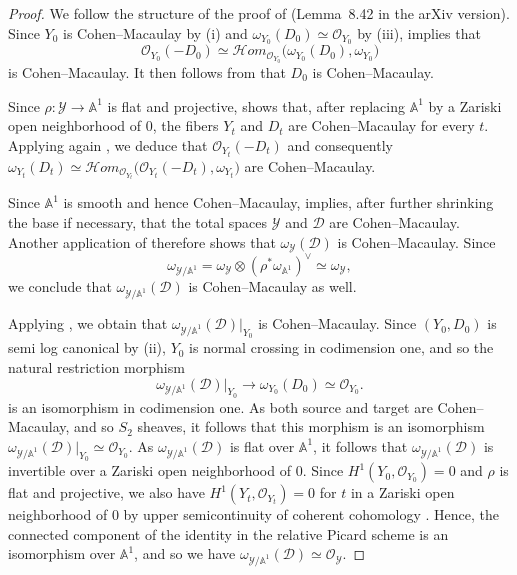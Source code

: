\documentclass[12pt,letterpaper, reqno]{amsart}
\theoremstyle{defstyle} \newtheorem{definition}[theorem]{Definition}
\theoremstyle{remark}
\numberwithin{equation}{section}
\numberwithin{figure}{section}
\newcommand{\A} {\mathbb{A}}
\newcommand{\cO} {\mathcal{O}}
\begin{document}
\begin{proof}
We follow the structure of the proof of \cite[Lemma~8.33]{GHKK} (Lemma~8.42 in the arXiv version).
Since $Y_0$ is Cohen--Macaulay by (i) and $\omega_{Y_0}(D_0)\simeq\mathcal O_{Y_0}$ by (iii), \cite[Corollary~2.71]{kollar2013singularities} implies that
\[
\mathcal O_{Y_0}(-D_0)
\simeq
\mathcal Hom_{\mathcal O_{Y_0}}\!\bigl(\omega_{Y_0}(D_0),\omega_{Y_0}\bigr)
\]
is Cohen--Macaulay. It then follows from \cite[Corollary~2.63]{kollar2013singularities} that $D_0$ is Cohen--Macaulay.

Since $\rho:\mathcal Y\to\A^1$ is flat and projective, \cite[Theorem~12.2.4]{grothendieck1966EGAIV} shows that, after replacing $\A^1$ by a Zariski open neighborhood of $0$, the fibers $Y_t$ and $D_t$ are Cohen--Macaulay for every $t$. Applying again \cite[Corollaries~2.63 and~2.71]{kollar2013singularities}, we deduce that
$\mathcal O_{Y_t}(-D_t)$
and consequently $
\omega_{Y_t}(D_t)
\simeq
\mathcal Hom_{\mathcal O_{Y_t}}
\bigl(\mathcal O_{Y_t}(-D_t),\omega_{Y_t}\bigr)$
are Cohen--Macaulay.

Since $\A^1$ is smooth and hence Cohen--Macaulay, \cite[\href{https://stacks.math.columbia.edu/tag/045J}{Tag~045J}]{stacks-project} implies, after further shrinking the base if necessary, that the total spaces $\mathcal Y$ and $\mathcal D$ are Cohen--Macaulay. Another application of \cite[Corollaries~2.63 and~2.71]{kollar2013singularities} therefore shows that $\omega_{\mathcal Y}(\mathcal D)$ is Cohen--Macaulay. Since
\[
\omega_{\mathcal Y/\A^1}
=
\omega_{\mathcal Y}\otimes(\rho^*\omega_{\A^1})^\vee
\simeq
\omega_{\mathcal Y},
\]
we conclude that $\omega_{\mathcal Y/\A^1}(\mathcal D)$ is Cohen--Macaulay as well.

Applying \cite[\href{https://stacks.math.columbia.edu/tag/045J}{Tag~045J}]{stacks-project}, we obtain that
$\omega_{\mathcal Y/\A^1}(\mathcal D)\big|_{Y_0}$ is Cohen--Macaulay.
Since $(Y_0,D_0)$ is semi log canonical by (ii), $Y_0$ is normal crossing in codimension one, and so the natural restriction morphism
\[
\omega_{\mathcal Y/\A^1}(\mathcal D)\big|_{Y_0}
\longrightarrow
\omega_{Y_0}(D_0)
\simeq
\mathcal O_{Y_0}.
\]
is an isomorphism in codimension one. As both source and target are Cohen--Macaulay, and so $S_2$ sheaves, it follows that this morphism is an isomorphism $
\omega_{\mathcal Y/\A^1}(\mathcal D)\big|_{Y_0}
\simeq
\mathcal O_{Y_0}$. As $\omega_{\mathcal Y/\A^1}(\mathcal D)$ is flat over $\A^1$, it follows that  $\omega_{\mathcal Y/\A^1}(\mathcal D)$ is invertible over a Zariski open neighborhood of $0$.
Since $H^1(Y_0,\mathcal O_{Y_0})=0$ and $\rho$ is flat and projective, we also have $H^1(Y_t, \cO_{Y_t})=0$ for $t$ in a Zariski open neighborhood of $0$ by upper semicontinuity of coherent cohomology \cite[Theorem III.12.8]{Hartshorne}. 
Hence, the connected component of the identity in the relative Picard scheme is an isomorphism over $\A^1$, and so we have
$\omega_{\mathcal Y/\A^1}(\mathcal D)
\simeq
\mathcal O_{\mathcal Y}$. 


\end{proof}
\end{document}

